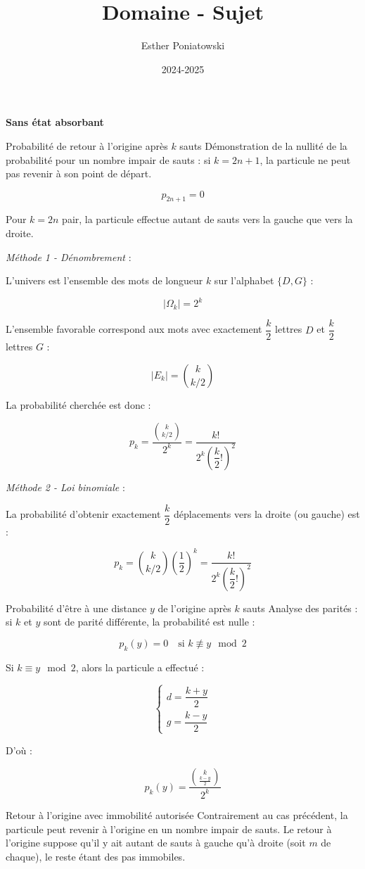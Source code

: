 \documentclass[10pt,a4paper]{article}
\title{Domaine - Sujet}
\author{Esther Poniatowski}
\date{2024-2025}
\begin{document}
\textbf{Sans état absorbant}

\q Probabilité de retour à l'origine après \( k \) sauts
Démonstration de la nullité de la probabilité pour un nombre impair de sauts : si \( k = 2n + 1 \),
la particule ne peut pas revenir à son point de départ.

\[
\boxed{p_{2n+1} = 0}
\]

Pour \( k = 2n \) pair, la particule effectue autant de sauts vers la gauche que vers la droite.

\medskip

\emph{Méthode 1 - Dénombrement} :

L'univers est l'ensemble des mots de longueur \( k \) sur l'alphabet \( \{D, G\} \) :

\[
|\Omega_k| = 2^k
\]

L'ensemble favorable correspond aux mots avec exactement \( \dfrac{k}{2} \) lettres \( D \) et \(
\dfrac{k}{2} \) lettres \( G \) :

\[
|E_k| = \binom{k}{k/2}
\]

La probabilité cherchée est donc :

\[
\boxed{p_k = \dfrac{\binom{k}{k/2}}{2^k} = \dfrac{k!}{2^k \left( \dfrac{k}{2}! \right)^2}}
\]

\medskip

\emph{Méthode 2 - Loi binomiale} :

La probabilité d'obtenir exactement \( \dfrac{k}{2} \) déplacements vers la droite (ou gauche) est :

\[
p_k = \binom{k}{k/2} \left( \dfrac{1}{2} \right)^k = \dfrac{k!}{2^k \left( \dfrac{k}{2}! \right)^2}
\]

\q Probabilité d'être à une distance \( y \) de l'origine après \( k \) sauts
Analyse des parités : si \( k \) et \( y \) sont de parité différente, la probabilité est nulle :

\[
\boxed{p_k(y) = 0 \quad \text{si } k \not\equiv y \mod 2}
\]

Si \( k \equiv y \mod 2 \), alors la particule a effectué :

\[
\begin{cases}
d = \dfrac{k + y}{2} \\
g = \dfrac{k - y}{2}
\end{cases}
\]

D'où :

\[
\boxed{p_k(y) = \dfrac{\binom{k}{\frac{k - y}{2}}}{2^k}}
\]

\q Retour à l'origine avec immobilité autorisée
Contrairement au cas précédent, la particule peut revenir à l'origine en un nombre impair de sauts.
Le retour à l'origine suppose qu'il y ait autant de sauts à gauche qu'à droite (soit \( m \) de
chaque), le reste étant des pas immobiles.
\end{document}
